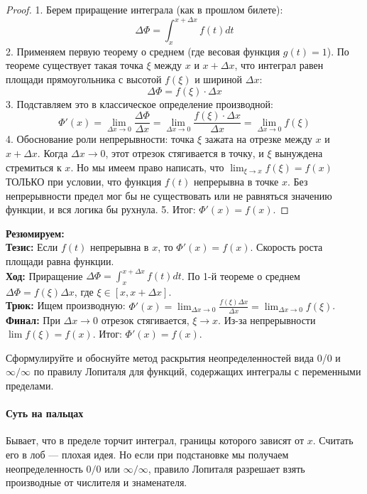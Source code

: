 \begin{proof}
1. Берем приращение интеграла (как в прошлом билете):
$$ \Delta \Phi = \int_x^{x+\Delta x} f(t)dt $$
2. Применяем первую теорему о среднем (где весовая функция $g(t) = 1$). По теореме существует такая точка $\xi$ между $x$ и $x+\Delta x$, что интеграл равен площади прямоугольника с высотой $f(\xi)$ и шириной $\Delta x$:
$$ \Delta \Phi = f(\xi) \cdot \Delta x $$
3. Подставляем это в классическое определение производной:
$$ \Phi'(x) = \lim_{\Delta x \to 0} \frac{\Delta \Phi}{\Delta x} = \lim_{\Delta x \to 0} \frac{f(\xi) \cdot \Delta x}{\Delta x} = \lim_{\Delta x \to 0} f(\xi) $$
4. Обоснование роли непрерывности: точка $\xi$ зажата на отрезке между $x$ и $x+\Delta x$. Когда $\Delta x \to 0$, этот отрезок стягивается в точку, и $\xi$ вынуждена стремиться к $x$. Но мы имеем право написать, что $\lim_{\xi \to x} f(\xi) = f(x)$ ТОЛЬКО при условии, что функция $f(t)$ непрерывна в точке $x$. Без непрерывности предел мог бы не существовать или не равняться значению функции, и вся логика бы рухнула.
5. Итог: $\Phi'(x) = f(x)$.
\end{proof}

\begin{tcolorbox}[colback=gray!5, colframe=black, boxrule=0.5pt, arc=0pt]
\textbf{Резюмируем:} \\
\textbf{Тезис:} Если $f(t)$ непрерывна в $x$, то $\Phi'(x) = f(x)$. Скорость роста площади равна функции. \\
\textbf{Ход:} Приращение $\Delta \Phi = \int_x^{x+\Delta x} f(t)dt$. По 1-й теореме о среднем $\Delta \Phi = f(\xi)\Delta x$, где $\xi \in [x, x+\Delta x]$. \\
\textbf{Трюк:} Ищем производную: $\Phi'(x) = \lim_{\Delta x \to 0} \frac{f(\xi)\Delta x}{\Delta x} = \lim_{\Delta x \to 0} f(\xi)$. \\
\textbf{Финал:} При $\Delta x \to 0$ отрезок стягивается, $\xi \to x$. Из-за непрерывности $\lim f(\xi) = f(x)$. Итог: $\Phi'(x) = f(x)$.
\end{tcolorbox}


{Сформулируйте и обоснуйте метод раскрытия неопределенностей вида 0/0 и $\infty/\infty$ по правилу Лопиталя для функций, содержащих интегралы с переменными пределами.}

\paragraph{Суть на пальцах}
Бывает, что в пределе торчит интеграл, границы которого зависят от $x$. Считать его в лоб — плохая идея. Но если при подстановке мы получаем неопределенность $0/0$ или $\infty/\infty$, правило Лопиталя разрешает взять производные от числителя и знаменателя. 

